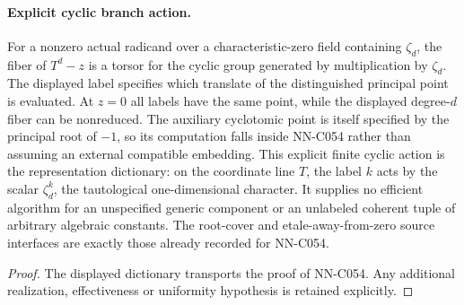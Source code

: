 \begin{geometricstatement}[NN-C054]
\paragraph{Explicit cyclic branch action.}
For a nonzero actual radicand over a characteristic-zero field
containing $\zeta_d$, the fiber of $T^d-z$ is a torsor for the
cyclic group generated by multiplication by $\zeta_d$.
The displayed label specifies which translate of the distinguished
principal point is evaluated.  At $z=0$ all labels have the same
point, while the displayed degree-$d$ fiber can be nonreduced.
The auxiliary cyclotomic point is itself specified by the principal
root of $-1$, so its computation falls inside NN-C054 rather than
assuming an external compatible embedding.  This explicit finite
cyclic action is the representation dictionary: on the coordinate
line $T$, the label $k$ acts by the scalar $\zeta_d^k$, the
tautological one-dimensional character.  It supplies no efficient algorithm for an
unspecified generic component or an unlabeled coherent tuple of
arbitrary algebraic constants.  The root-cover and etale-away-from-zero
source interfaces are exactly those already recorded for NN-C054.
\end{geometricstatement}
\begin{proof} The displayed dictionary transports the proof of NN-C054. Any additional realization, effectiveness or uniformity hypothesis is retained explicitly.\end{proof}


